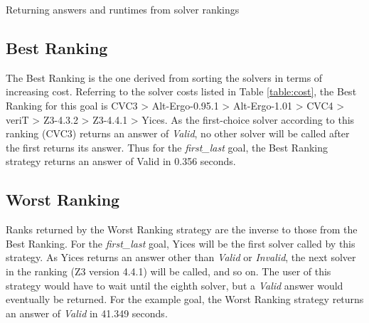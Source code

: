 \begin{algorithm}
	\caption{Returning answers and runtimes from solver rankings}
	\label{algo:rank}
	
\end{algorithm}


\subsection{\textsf{Best Ranking}}
\label{sub:best}

The \textsf{Best Ranking} is the one derived from sorting the solvers in terms of increasing cost. 
Referring to the solver costs listed in Table \ref{table:cost}, the \textsf{Best Ranking} for this goal is
CVC3 > Alt-Ergo-0.95.1 > Alt-Ergo-1.01 > CVC4 > veriT > Z3-4.3.2 > Z3-4.4.1 > Yices. 
As the first-choice solver according to this ranking (CVC3) returns an answer of \textit{Valid}, no other solver will be called after the first returns its answer. 
Thus for the \textit{first\_last} goal, the \textsf{Best Ranking} strategy returns an answer of \textsf{Valid} in 0.356 seconds.   

\subsection{\textsf{Worst Ranking}}
\label{sub:worst}

Ranks returned by the \textsf{Worst Ranking} strategy are the inverse to those from the \textsf{Best Ranking}. 
For the \textit{first\_last} goal, Yices will be the first solver called by this strategy.
As Yices returns an answer other than \textit{Valid} or \textit{Invalid}, the next solver in the ranking (Z3 version 4.4.1) will be called, and so on.
The user of this strategy would have to wait until the eighth solver, but a \textit{Valid} answer would eventually be returned.
For the example goal, the \textsf{Worst Ranking} strategy returns an answer of \textit{Valid} in 41.349 seconds.

